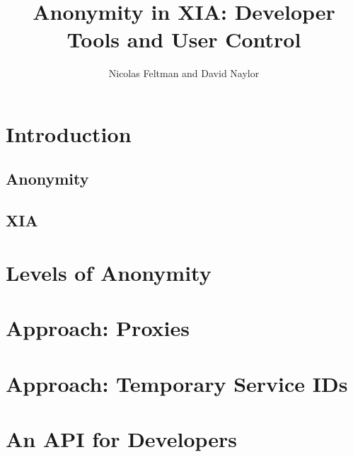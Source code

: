 \documentclass[11pt]{article}
\title{Anonymity in XIA: Developer Tools and User Control}
\author{Nicolas Feltman and David Naylor}
\date{}
\begin{document}
\maketitle

\section{Introduction}
\subsection{Anonymity}
\subsection{XIA}


\section{Levels of Anonymity}


\section{Approach: Proxies}


\section{Approach: Temporary Service IDs}


\section{An API for Developers}
\end{document}
